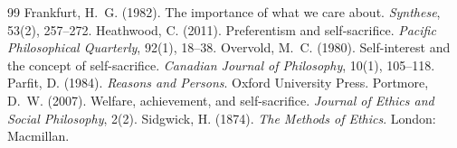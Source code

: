 \documentclass{situationist-preprint}
\begin{document}
\begin{thebibliography}{99}\small
{} Frankfurt, H.~G. (1982). The importance of what we care about. \emph{Synthese}, 53(2), 257--272.
 Heathwood, C. (2011). Preferentism and self-sacrifice. \emph{Pacific Philosophical Quarterly}, 92(1), 18--38.
 Overvold, M.~C. (1980). Self-interest and the concept of self-sacrifice. \emph{Canadian Journal of Philosophy}, 10(1), 105--118.
 Parfit, D. (1984). \emph{Reasons and Persons}. Oxford University Press.
 Portmore, D.~W. (2007). Welfare, achievement, and self-sacrifice. \emph{Journal of Ethics and Social Philosophy}, 2(2).
 Sidgwick, H. (1874). \emph{The Methods of Ethics}. London: Macmillan.
\end{thebibliography}
\end{document}
